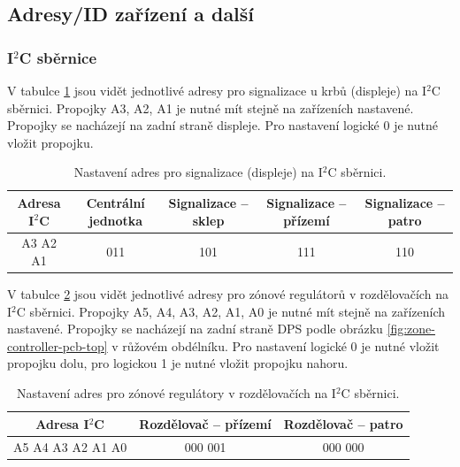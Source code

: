 
\begin{Czech}
\subsection{Adresy/ID zařízení a další}
\end{Czech}

\begin{Czech}
\subsubsection{I$^2$C sběrnice}
\end{Czech}

\begin{Czech}
V tabulce \ref{tab:i2c-bus-signalizations} jsou vidět jednotlivé adresy pro signalizace u krbů (displeje) na I$^2$C sběrnici. Propojky A3, A2, A1 je nutné mít stejně na zařízeních nastavené. Propojky se nacházejí na zadní straně displeje. Pro nastavení logické 0 je nutné vložit propojku.
\end{Czech}

\begin{Czech}
\begin{table}[H]
\centering
\begin{tabular}{||c || c c c c||} 
 \hline
 Adresa I$^2$C & Centrální jednotka & Signalizace – sklep & Signalizace – přízemí & Signalizace – patro \\  
 \hline\hline
  A3 A2 A1 & 011 & 101 & 111 & 110 \\ 
 \hline
\end{tabular}
\caption{Nastavení adres pro signalizace (displeje) na I$^2$C sběrnici.}
\label{tab:i2c-bus-signalizations}
\end{table}
\end{Czech}

\begin{Czech}
V tabulce \ref{tab:i2c-bus-zone-controllers} jsou vidět jednotlivé adresy pro zónové regulátorů  v rozdělovačích na I$^2$C sběrnici. Propojky A5, A4, A3, A2, A1, A0 je nutné mít stejně na zařízeních nastavené. Propojky se nacházejí na zadní straně DPS podle obrázku \ref{fig:zone-controller-pcb-top} v růžovém obdélníku. Pro nastavení logické 0 je nutné vložit propojku dolu, pro logickou 1 je nutné vložit propojku nahoru.
\end{Czech}

\begin{Czech}
\begin{table}[H]
\centering
\begin{tabular}{||c || c c ||} 
 \hline
 Adresa I$^2$C & Rozdělovač  – přízemí & Rozdělovač  – patro \\ 
 \hline\hline
 A5 A4 A3 A2 A1 A0 & 000 001 & 000 000\\ 
 \hline
\end{tabular}
\caption{Nastavení adres pro zónové regulátory v rozdělovačích na I$^2$C sběrnici.}
\label{tab:i2c-bus-zone-controllers}
\end{table}
\end{Czech}

